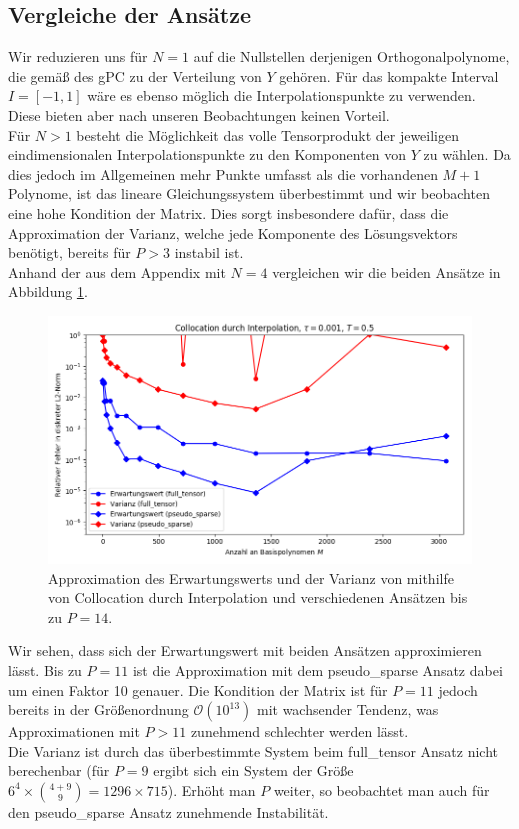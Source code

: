 \subsection{Vergleiche der Ansätze}
Wir reduzieren uns für $N=1$ auf die Nullstellen derjenigen Orthogonalpolynome, die gemäß des gPC zu der Verteilung von $Y$ gehören. Für das kompakte Interval $I=[-1,1]$ wäre es ebenso möglich die \chebyspace Interpolationspunkte zu verwenden. Diese bieten aber nach unseren Beobachtungen keinen Vorteil.\\
Für $N>1$ besteht die Möglichkeit das volle Tensorprodukt der jeweiligen eindimensionalen Interpolationspunkte zu den Komponenten von $Y$ zu wählen. Da dies jedoch im Allgemeinen mehr Punkte umfasst als die vorhandenen $M+1$ Polynome, ist das lineare Gleichungssystem überbestimmt und wir beobachten eine hohe Kondition der Matrix. Dies sorgt insbesondere dafür, dass die Approximation der Varianz, welche jede Komponente des Lösungsvektors benötigt, bereits für $P>3$ instabil ist.\\
Anhand der  aus dem Appendix mit $N=4$ vergleichen wir die beiden Ansätze in Abbildung \ref{fig:collocation_trial8}. 
\begin{figure}[!htb]
\centering
\includegraphics[width=\linewidth]{Figures/collocation_mi_trial8_ft_pseudosparse.png}
\caption{Approximation des Erwartungswerts und der Varianz von  mithilfe von Collocation durch Interpolation und verschiedenen Ansätzen bis zu $P=14$.}
\label{fig:collocation_trial8}
\end{figure}
Wir sehen, dass sich der Erwartungswert mit beiden Ansätzen approximieren lässt. Bis zu $P=11$ ist die Approximation mit dem pseudo\_sparse Ansatz dabei um einen Faktor 10 genauer. Die Kondition der Matrix ist für $P=11$ jedoch bereits in der Größenordnung $\mathcal{O}(10^{13})$ mit wachsender Tendenz, was Approximationen mit $P>11$ zunehmend schlechter werden lässt.\\
Die Varianz ist durch das überbestimmte System beim full\_tensor Ansatz nicht berechenbar (für $P=9$ ergibt sich ein System der Größe $6^4\times \binom{4+9}{9} =1296\times 715$). Erhöht man $P$ weiter, so beobachtet man auch für den pseudo\_sparse Ansatz zunehmende Instabilität.

